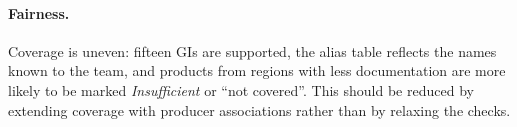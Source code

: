 \paragraph{Fairness.} Coverage is uneven: fifteen GIs are supported, the alias table reflects the names
known to the team, and products from regions with less documentation are more likely to be marked
\emph{Insufficient} or ``not covered''. This should be reduced by extending coverage with producer
associations rather than by relaxing the checks.
